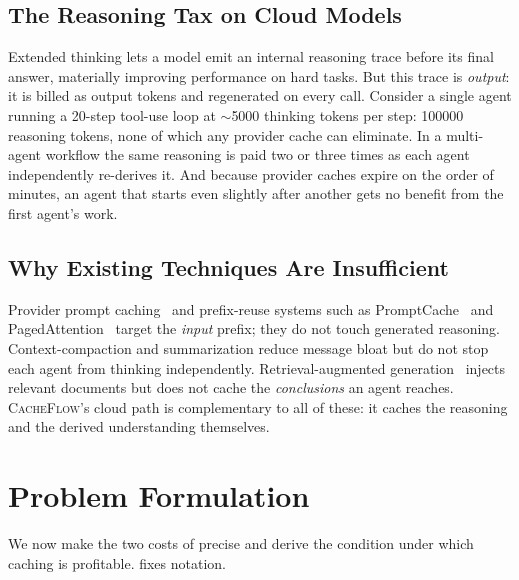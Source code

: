 \documentclass[10pt]{article}
\begin{document}
\subsection{The Reasoning Tax on Cloud Models}
Extended thinking lets a model emit an internal reasoning trace before its final
answer, materially improving performance on hard tasks. But this trace is
\emph{output}: it is billed as output tokens and regenerated on every call.
Consider a single agent running a 20-step tool-use loop at $\sim$\num{5000}
thinking tokens per step: \num{100000} reasoning tokens, none of which any
provider cache can eliminate. In a multi-agent workflow the same reasoning is
paid two or three times as each agent independently re-derives it. And because
provider caches expire on the order of minutes, an agent that starts even
slightly after another gets no benefit from the first agent's work.

\subsection{Why Existing Techniques Are Insufficient}
Provider prompt caching~\cite{anthropic-caching} and prefix-reuse systems such
as PromptCache~\cite{promptcache} and PagedAttention~\cite{pagedattention}
target the \emph{input} prefix; they do not touch generated reasoning.
Context-compaction and summarization reduce message bloat but do not stop each
agent from thinking independently. Retrieval-augmented
generation~\cite{rag} injects relevant documents but does not cache the
\emph{conclusions} an agent reaches. \textsc{CacheFlow}'s cloud path is
complementary to all of these: it caches the reasoning and the derived
understanding themselves.

\section{Problem Formulation}
\label{sec:problem}

We now make the two costs of  precise and derive the condition
under which caching is profitable.  fixes notation.
\end{document}
